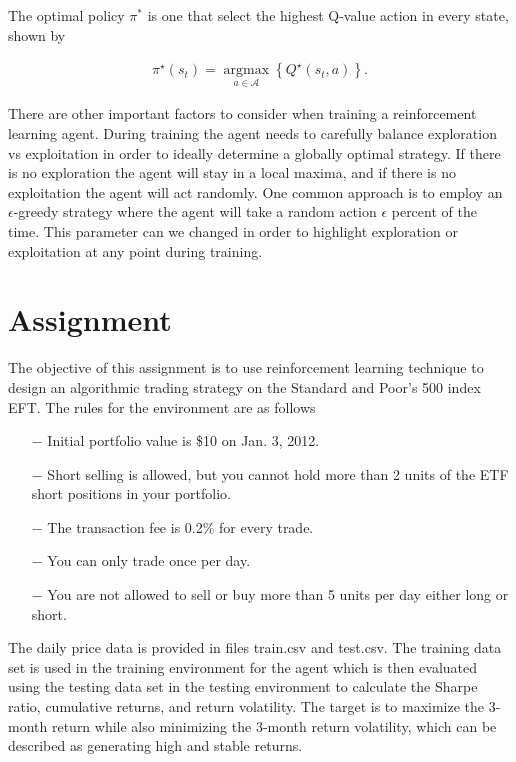 \documentclass[a4paper]{article}
\begin{document}
The optimal policy $\pi^*$ is one that select the highest Q-value action in every state, shown by

\begin{align*}
	\pi^{\star}\left(s_{t}\right)=\underset{a \in \mathcal{A}}{\operatorname{argmax}}\left\{Q^{\star}\left(s_{t}, a\right)\right\} .
\end{align*}

There are other important factors to consider when training a reinforcement learning agent. During training the agent needs to carefully balance exploration vs exploitation in order to ideally determine a globally optimal strategy. If there is no exploration the agent will stay in a local maxima, and if there is no exploitation the agent will act randomly. One common approach is to employ an $\epsilon$-greedy strategy where the agent will take a random action $\epsilon$ percent of the time. This parameter can we changed in order to highlight exploration or exploitation at any point during training.

\section{Assignment}

The objective of this assignment is to use reinforcement learning technique to design an algorithmic trading strategy on the Standard and Poor's 500 index EFT. The rules for the environment are as follows

\begin{itemize}
	\item[$-$] Initial portfolio value is \$10 on Jan. 3, 2012.
	\item[$-$] Short selling is allowed, but you cannot hold more than 2 units of the ETF short positions in your portfolio.
	\item[$-$] The transaction fee is 0.2\% for every trade.
	\item[$-$] You can only trade once per day.
	\item[$-$] You are not allowed to sell or buy more than 5 units per day either long or short.
\end{itemize}

The daily price data is provided in files train.csv and test.csv. The training data set is used in the training environment for the agent which is then evaluated using the testing data set in the testing environment to calculate the Sharpe ratio, cumulative returns, and return volatility. The target is to maximize the 3-month return while also minimizing the 3-month return volatility, which can be described as generating high and stable returns.
\end{document}
